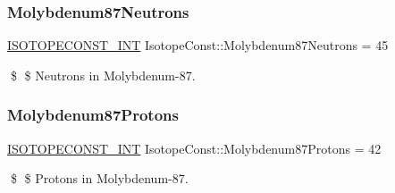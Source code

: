\subsubsection{\texorpdfstring{Molybdenum87\+Neutrons}{Molybdenum87Neutrons}}
{\footnotesize\ttfamily \mbox{\hyperlink{group___isotope_const-_macros_ga5f18360b3e99483a35c32d789e62621c}{I\+S\+O\+T\+O\+P\+E\+C\+O\+N\+S\+T\+\_\+\+I\+NT}} Isotope\+Const\+::\+Molybdenum87\+Neutrons = 45}

\$ \$ Neutrons in Molybdenum-\/87. \mbox{\label{group___isotope_const-_molybdenum-_mo87_gac63641217701f753bb5a1cbaddd43e0b}} 
\subsubsection{\texorpdfstring{Molybdenum87\+Protons}{Molybdenum87Protons}}
{\footnotesize\ttfamily \mbox{\hyperlink{group___isotope_const-_macros_ga5f18360b3e99483a35c32d789e62621c}{I\+S\+O\+T\+O\+P\+E\+C\+O\+N\+S\+T\+\_\+\+I\+NT}} Isotope\+Const\+::\+Molybdenum87\+Protons = 42}

\$ \$ Protons in Molybdenum-\/87. 